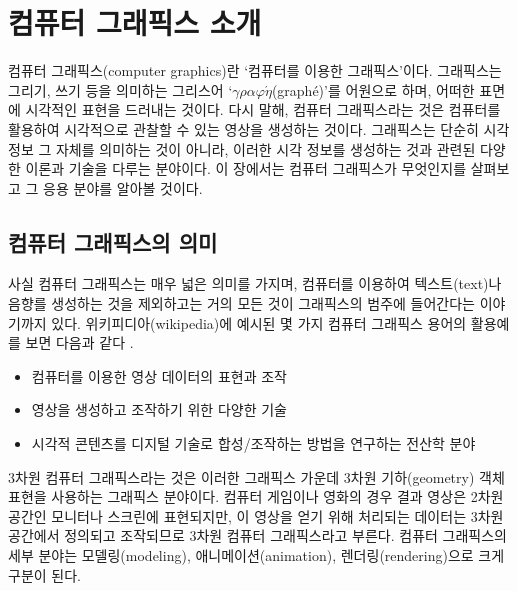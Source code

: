 \renewcommand\chapterillustration{OGL_intro/chapterImage}



\chapter{컴퓨터 그래픽스 소개}

컴퓨터 그래픽스(computer graphics)란 ‘컴퓨터를 이용한 그래픽스’이다. 그래픽스는 그리기, 쓰기 등을 의미하는 그리스어  ‘$\gamma\rho\alpha\varphi\acute{\eta}$(graph\'{e})’를 어원으로 하며, 어떠한 표면에 시각적인 표현을 드러내는 것이다. 다시 말해, 컴퓨터 그래픽스라는 것은 컴퓨터를 활용하여 시각적으로 관찰할 수 있는 영상을 생성하는 것이다.
그래픽스는 단순히 시각 정보 그 자체를 의미하는 것이 아니라, 이러한 시각 정보를 생성하는 것과 관련된 다양한 이론과 기술을 다루는 분야이다.
이 장에서는 컴퓨터 그래픽스가 무엇인지를 살펴보고 그 응용 분야를 알아볼 것이다.
\index{$\gamma\rho\alpha\varphi\acute{\eta}$}

\section{컴퓨터 그래픽스의 의미}

사실 컴퓨터 그래픽스는 매우 넓은 의미를 가지며, 컴퓨터를 이용하여 텍스트(text)나 음향를 생성하는 것을 제외하고는 거의 모든 것이 그래픽스의 범주에 들어간다는 이야기까지 있다. 위키피디아(wikipedia)에 예시된 몇 가지 컴퓨터 그래픽스 용어의 활용예를 보면 다음과 같다 \cite{wiki:computerGraphics}.

\begin{itemize}
\item 컴퓨터를 이용한 영상 데이터의 표현과 조작
\item 영상을 생성하고 조작하기 위한 다양한 기술
\item 시각적 콘텐츠를 디지털 기술로 합성/조작하는 방법을 연구하는 전산학 분야
\end{itemize}

3차원 컴퓨터 그래픽스라는 것은 이러한 그래픽스 가운데 3차원 기하(geometry) 객체 표현을 사용하는 그래픽스 분야이다. 컴퓨터 게임이나 영화의 경우 결과 영상은 2차원 공간인 모니터나 스크린에 표현되지만, 이 영상을 얻기 위해 처리되는 데이터는 3차원 공간에서 정의되고 조작되므로 3차원 컴퓨터 그래픽스라고 부른다.
컴퓨터 그래픽스의 세부 분야는 모델링(modeling), 애니메이션(animation), 렌더링(rendering)으로 크게 구분이 된다.


